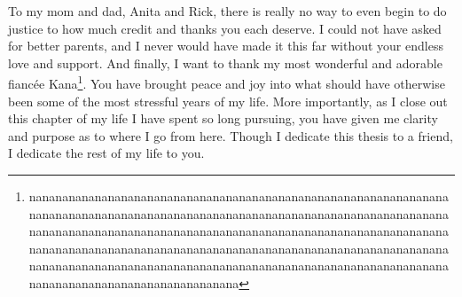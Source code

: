 To my mom and dad, Anita and Rick, there is really no way to even begin to do justice
    to how much credit and thanks you each deserve.
I could not have asked for better parents,
    and I never would have made it this far without your endless love and support.
And finally, I want to thank my most wonderful and adorable
    fianc\'ee Kana\footnote{nananananananananananananananananananananananananananananananananananananananananananananananananananananananananananananananananananananananananananananananananananananananananananananananananananananananananananananananananananananananananananananananananananananananananananananananananananananananananananananananananananananananananananananananana}.
You have brought peace and joy into what should have otherwise been
    some of the most stressful years of my life.
More importantly, as I close out this chapter of my life I have spent so long pursuing,
    you have given me clarity and purpose as to where I go from here.
Though I dedicate this thesis to a friend,
    I dedicate the rest of my life to you.
